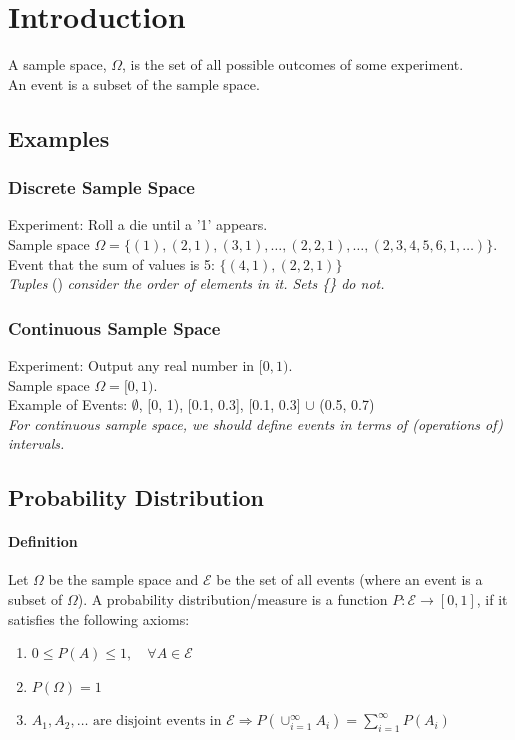 \documentclass[../Probability.tex]{subfiles}
\begin{document}
\section{Introduction}
A sample space, $\Omega$, is the set of all possible outcomes of some experiment. \\
An event is a subset of the sample space.

\subsection{Examples}
\subsubsection*{Discrete Sample Space}
Experiment: Roll a die until a '1' appears. \\
Sample space $\Omega = \{(1), (2, 1), (3, 1), \ldots, (2, 2, 1), \ldots, (2, 3, 4, 5, 6, 1, \ldots)\}$. \\
Event that the sum of values is 5: $\{(4, 1), (2, 2, 1)\}$ \\
\textit{Tuples }() \textit{consider the order of elements in it. Sets \{\} do not.}

\subsubsection*{Continuous Sample Space}
Experiment: Output any real number in $[0, 1)$. \\
Sample space $\Omega = [0, 1)$. \\
Example of Events: $\emptyset$, [0, 1), [0.1, 0.3], [0.1, 0.3] $\cup$ (0.5, 0.7) \\
\textit{For continuous sample space, we should define events in  terms of (operations of) intervals.}

\subsection{Probability Distribution}
\paragraph{Definition} Let $\Omega$ be the sample space and $\mathcal{E}$ be the set of all events (where an event is a subset of $\Omega$).
A probability distribution/measure is a function $P: \mathcal{E} \rightarrow [0,1]$,
if it satisfies the following axioms:
\begin{enumerate}
    \item $0 \leq P(A) \leq 1, \quad \forall A \in \mathcal{E}$
    \item $P(\Omega) = 1$
    \item $A_1, A_2, \ldots \text{ are disjoint events in }\mathcal{E} \Rightarrow P(\cup_{i=1}^{\infty} A_i) = \sum_{i=1}^{\infty} P(A_i)$
\end{enumerate}
\end{document}
